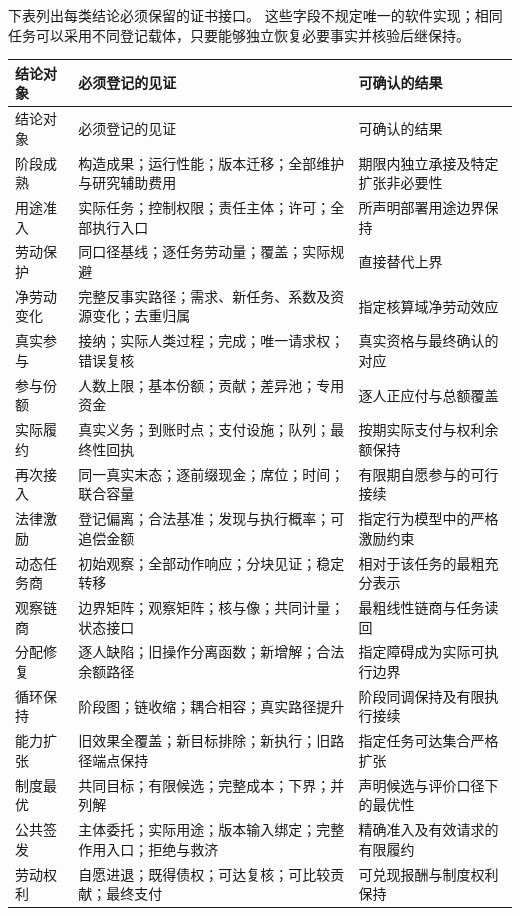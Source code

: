 \documentclass[UTF8,12pt,a4paper,openany,fontset=none,zihao=false]{ctexrep}
\theoremstyle{definition}
\newcommand{\1}{\mathbf 1}
\begin{document}
下表列出每类结论必须保留的证书接口。
这些字段不规定唯一的软件实现；相同任务可以采用不同登记载体，只要能够独立恢复必要事实并核验后继保持。
\begingroup
\small
\renewcommand{\arraystretch}{1.18}
\begin{longtable}{p{}p{}p{}}
\toprule
结论对象 & 必须登记的见证 & 可确认的结果\\
\midrule
\endfirsthead
\toprule
结论对象 & 必须登记的见证 & 可确认的结果\\
\midrule
\endhead
阶段成熟 & 构造成果；运行性能；版本迁移；全部维护与研究辅助费用 & 期限内独立承接及特定扩张非必要性\\
用途准入 & 实际任务；控制权限；责任主体；许可；全部执行入口 & 所声明部署用途边界保持\\
劳动保护 & 同口径基线；逐任务劳动量；覆盖；实际规避 & 直接替代上界\\
净劳动变化 & 完整反事实路径；需求、新任务、系数及资源变化；去重归属 & 指定核算域净劳动效应\\
真实参与 & 接纳；实际人类过程；完成；唯一请求权；错误复核 & 真实资格与最终确认的对应\\
参与份额 & 人数上限；基本份额；贡献；差异池；专用资金 & 逐人正应付与总额覆盖\\
实际履约 & 真实义务；到账时点；支付设施；队列；最终性回执 & 按期实际支付与权利余额保持\\
再次接入 & 同一真实末态；逐前缀现金；席位；时间；联合容量 & 有限期自愿参与的可行接续\\
法律激励 & 登记偏离；合法基准；发现与执行概率；可追偿金额 & 指定行为模型中的严格激励约束\\
动态任务商 & 初始观察；全部动作响应；分块见证；稳定转移 & 相对于该任务的最粗充分表示\\
观察链商 & 边界矩阵；观察矩阵；核与像；共同计量；状态接口 & 最粗线性链商与任务读回\\
分配修复 & 逐人缺陷；旧操作分离函数；新增解；合法余额路径 & 指定障碍成为实际可执行边界\\
循环保持 & 阶段图；链收缩；耦合相容；真实路径提升 & 阶段同调保持及有限执行接续\\
能力扩张 & 旧效果全覆盖；新目标排除；新执行；旧路径端点保持 & 指定任务可达集合严格扩张\\
制度最优 & 共同目标；有限候选；完整成本；下界；并列解 & 声明候选与评价口径下的最优性\\
公共签发 & 主体委托；实际用途；版本输入绑定；完整作用入口；拒绝与救济 & 精确准入及有效请求的有限履约\\
劳动权利 & 自愿进退；既得债权；可达复核；可比较贡献；最终支付 & 可兑现报酬与制度权利保持\\

\end{longtable}
\end{document}
